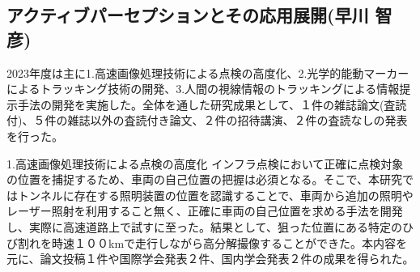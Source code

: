 



\subsection{アクティブパーセプションとその応用展開(早川 智彦)}

2023年度は主に1.高速画像処理技術による点検の高度化、2.光学的能動マーカーによるトラッキング技術の開発、3.人間の視線情報のトラッキングによる情報提示手法の開発を実施した。全体を通した研究成果として、１件の雑誌論文(査読付)、５件の雑誌以外の査読付き論文、２件の招待講演、２件の査読なしの発表を行った。

 1.高速画像処理技術による点検の高度化
インフラ点検において正確に点検対象の位置を捕捉するため、車両の自己位置の把握は必須となる。そこで、本研究ではトンネルに存在する照明装置の位置を認識することで、車両から追加の照明やレーザー照射を利用すること無く、正確に車両の自己位置を求める手法を開発し、実際に高速道路上で試すに至った。結果として、狙った位置にある特定のひび割れを時速１００kmで走行しながら高分解撮像することができた。本内容を元に、論文投稿１件や国際学会発表２件、国内学会発表２件の成果を得られた。

